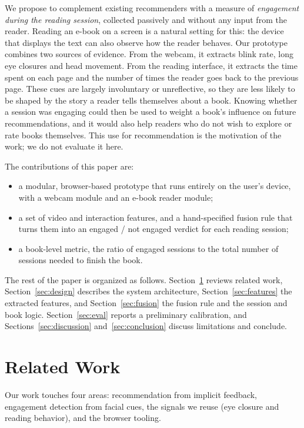 \documentclass[sigconf,nonacm]{acmart}
\begin{document}
We propose to complement existing recommenders with a measure of \emph{engagement during the reading session},
collected passively and without any input from the reader. Reading an e-book on a screen is a natural setting for this:
the device that displays the text can also observe how the reader behaves. Our prototype combines two sources of
evidence. From the webcam, it extracts blink rate, long eye closures and head movement. From the reading interface,
it extracts the time spent on each page and the number of times the reader goes back to the previous page. These cues
are largely involuntary or unreflective, so they are less likely to be shaped by the story a reader tells themselves
about a book. Knowing whether a session was engaging could then be used to weight a book's influence on future
recommendations, and it would also help readers who do not wish to explore or rate books themselves.
This use for recommendation is the motivation of the work; we do not evaluate it here.

The contributions of this paper are:
\begin{itemize}
  \item a modular, browser-based prototype that runs entirely on the user's device, with a webcam module and an
        e-book reader module;
  \item a set of video and interaction features, and a hand-specified fusion rule that turns them into an
        engaged / not engaged verdict for each reading session;
  \item a book-level metric, the ratio of engaged sessions to the total number of sessions needed to finish the book.
\end{itemize}

The rest of the paper is organized as follows. Section~\ref{sec:related} reviews related work, Section~\ref{sec:design}
describes the system architecture, Section~\ref{sec:features} the extracted features, and Section~\ref{sec:fusion} the
fusion rule and the session and book logic. Section~\ref{sec:eval} reports a preliminary calibration, and
Sections~\ref{sec:discussion} and~\ref{sec:conclusion} discuss limitations and conclude.

\section{Related Work}\label{sec:related}
Our work touches four areas: recommendation from implicit feedback, engagement detection from facial cues, the signals
we reuse (eye closure and reading behavior), and the browser tooling.
\end{document}
